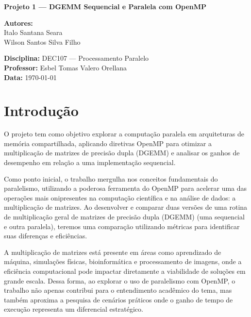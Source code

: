 \documentclass[12pt, a4paper]{article}
\begin{document}
	\begin{titlepage}
		\centering
		\vspace*{2cm}

		{\huge\bfseries Projeto 1 — DGEMM Sequencial e Paralela com OpenMP\par}
		\vspace{1.5cm}

		{\Large \textbf{Autores:}\\ Italo Santana Seara\\ Wilson Santos Silva Filho\\ }

		\vspace{2cm}

		{\large \textbf{Disciplina:} DEC107 — Processamento Paralelo\\ \textbf{Professor:} Esbel Tomas Valero Orellana\\ \textbf{Data:} \today\\ }

		\vfill
	\end{titlepage}

	\tableofcontents

	\newpage
	\section{Introdução}

	O projeto tem como objetivo explorar a computação paralela em arquiteturas de memória compartilhada, aplicando diretivas OpenMP para otimizar a multiplicação de matrizes de precisão dupla (DGEMM) e analisar os ganhos de desempenho em relação a uma implementação sequencial.

	Como ponto inicial, o trabalho mergulha nos conceitos fundamentais do paralelismo, utilizando a poderosa ferramenta do OpenMP para acelerar uma das operações mais onipresentes na computação científica e na análise de dados: a multiplicação de matrizes. Ao desenvolver e comparar duas versões de uma rotina de multiplicação geral de matrizes de precisão dupla (DGEMM) (uma sequencial e outra paralela), teremos uma comparação utilizando métricas para identificar suas diferenças e eficiências.

	A multiplicação de matrizes está presente em áreas como aprendizado de máquina, simulações físicas, bioinformática e processamento de imagens, onde a eficiência computacional pode impactar diretamente a viabilidade de soluções em grande escala. Dessa forma, ao explorar o uso de paralelismo com OpenMP, o trabalho não apenas contribui para o entendimento acadêmico do tema, mas também aproxima a pesquisa de cenários práticos onde o ganho de tempo de execução representa um diferencial estratégico.
\end{document}
